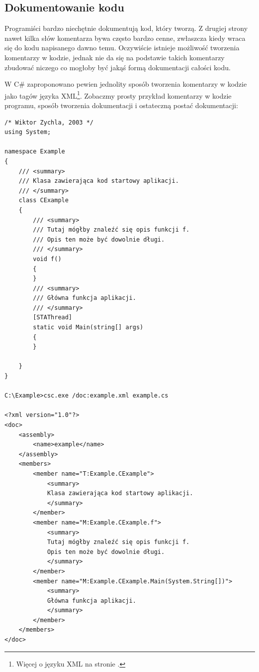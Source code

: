 \subsection{Dokumentowanie kodu}
\label{dokumentowanieKodu}

Programiści bardzo niechętnie dokumentują kod, który tworzą. Z drugiej strony nawet kilka
słów komentarza bywa często bardzo cenne, zwłaszcza kiedy wraca się do kodu napisanego dawno temu.
Oczywiście istnieje możliwość tworzenia komentarzy w kodzie, jednak nie da się na podstawie takich
komentarzy zbudować niczego co mogłoby być jakąś formą dokumentacji całości kodu.

W C\# zaproponowano pewien jednolity sposób tworzenia komentarzy w kodzie jako tagów języka 
XML\footnote{Więcej o języku XML na stronie \pageref{section_XML}.}. Zobaczmy prosty przykład
komentarzy w kodzie programu, sposób tworzenia dokumentacji i ostateczną postać dokumentacji:

\begin{scriptsize}
\begin{verbatim}
/* Wiktor Zychla, 2003 */
using System;

namespace Example
{
    /// <summary>
    /// Klasa zawierająca kod startowy aplikacji.
    /// </summary>
    class CExample
    {
        /// <summary>
        /// Tutaj mógłby znaleźć się opis funkcji f.
        /// Opis ten może być dowolnie długi.
        /// </summary> 
        void f()
        {
        }
        /// <summary>
        /// Główna funkcja aplikacji.
        /// </summary>
        [STAThread]
        static void Main(string[] args) 
        {
        }

    }
}

C:\Example>csc.exe /doc:example.xml example.cs

<?xml version="1.0"?>
<doc>
    <assembly>
        <name>example</name>
    </assembly>
    <members>
        <member name="T:Example.CExample">
            <summary>
            Klasa zawierająca kod startowy aplikacji.
            </summary>
        </member>
        <member name="M:Example.CExample.f">
            <summary>
            Tutaj mógłby znaleźć się opis funkcji f.
            Opis ten może być dowolnie długi.
            </summary> 
        </member>
        <member name="M:Example.CExample.Main(System.String[])">
            <summary>
            Główna funkcja aplikacji.
            </summary>
        </member>
    </members>
</doc>
\end{verbatim}
\end{scriptsize}


